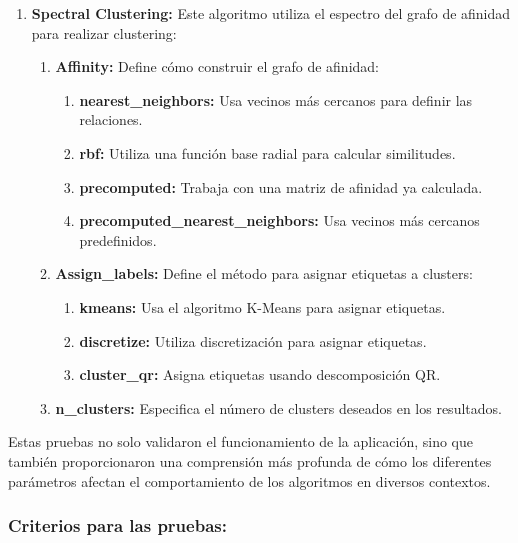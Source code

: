 \begin{enumerate}
    \item \textbf{Spectral Clustering:}
    Este algoritmo utiliza el espectro del grafo de afinidad para realizar clustering:
    \begin{enumerate}
        \item \textbf{Affinity:} Define cómo construir el grafo de afinidad:
        \begin{enumerate}
            \item \textbf{nearest\_neighbors:} Usa vecinos más cercanos para definir las relaciones.
            \item \textbf{rbf:} Utiliza una función base radial para calcular similitudes.
            \item \textbf{precomputed:} Trabaja con una matriz de afinidad ya calculada.
            \item \textbf{precomputed\_nearest\_neighbors:} Usa vecinos más cercanos predefinidos.
        \end{enumerate}
        \item \textbf{Assign\_labels:} Define el método para asignar etiquetas a clusters:
        \begin{enumerate}
            \item \textbf{kmeans:} Usa el algoritmo K-Means para asignar etiquetas.
            \item \textbf{discretize:} Utiliza discretización para asignar etiquetas.
            \item \textbf{cluster\_qr:} Asigna etiquetas usando descomposición QR.
        \end{enumerate}
        \item \textbf{n\_clusters:} Especifica el número de clusters deseados en los resultados.
    \end{enumerate}
\end{enumerate}

Estas pruebas no solo validaron el funcionamiento de la aplicación, sino que también proporcionaron una comprensión más profunda de cómo los diferentes parámetros afectan el comportamiento de los algoritmos en diversos contextos.

\subsubsection*{Criterios para las pruebas:}

